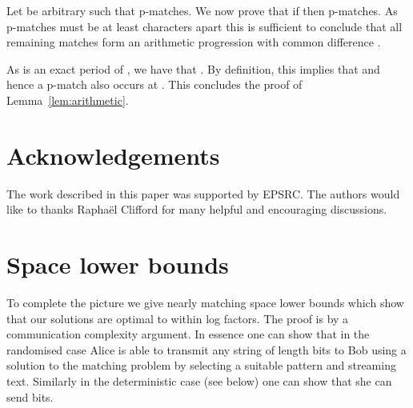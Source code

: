 \documentclass[11pt,a4paper]{article}
\theoremstyle{theorem}
\newcommand{\pmatch}{\mbox{p-match}\xspace}
\newcommand{\pmatches}{\mbox{p-matches}\xspace}
\begin{document}
Let  be arbitrary such that  \pmatches . We now prove that if  then  \pmatches . As \pmatches must be at least  characters apart this is sufficient to conclude that all remaining matches form an arithmetic progression with common difference .

As  is an exact period of , we have that . By definition, this implies that  and hence a \pmatch also occurs at . This concludes the proof of Lemma~\ref{lem:arithmetic}.


\section{Acknowledgements}

The work described in this paper was supported by EPSRC. The authors would like to thanks Rapha\"el Clifford for many helpful and encouraging discussions.
















































\printbibliography

\newpage






\appendix






\section{Space lower bounds}\label{appendix:space}


To complete the picture we give nearly matching space lower bounds which show that our
solutions are optimal to within log factors.  The proof is by a
communication complexity argument. In
essence one can show that in the randomised case Alice is able to
transmit any string of length  bits to Bob
using a solution to the matching problem by selecting a suitable pattern and streaming text.  Similarly in the deterministic case (see below) one can show
that she can send  bits.
\end{document}
